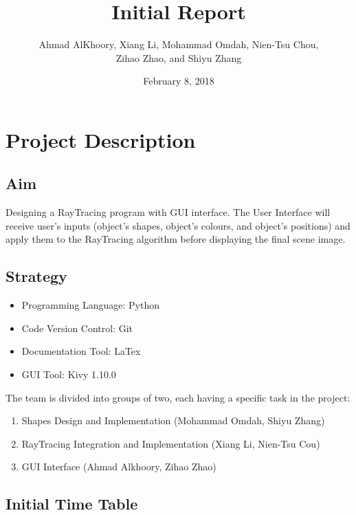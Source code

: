 \documentclass{article}
\title{Initial Report}
\author{Ahmad AlKhoory, Xiang Li, Mohammad Omdah, Nien-Tsu Chou, \\ Zihao Zhao, and Shiyu Zhang}
\date{February 8, 2018}
\begin{document}
\maketitle

\section{Project Description}
\subsection{Aim}

Designing a RayTracing program with GUI interface. The User Interface will receive user's inputs (object's shapes, object's colours, and object's positions) and apply them to the RayTracing algorithm before displaying the final scene image.

\subsection{Strategy}


\begin{itemize}
\item Programming Language: Python
\item Code Version Control: Git
\item Documentation Tool: LaTex
\item GUI Tool: Kivy 1.10.0 \\
\end{itemize}

The team is divided into groups of two, each having a specific task in the project:
\begin{enumerate}
\item Shapes Design and Implementation (Mohammad Omdah, Shiyu Zhang)
\item RayTracing Integration and Implementation (Xiang Li, Nien-Tsu Cou)
\item GUI Interface (Ahmad Alkhoory, Zihao Zhao)
\end{enumerate}


\subsection{Initial Time Table}
\end{document}
